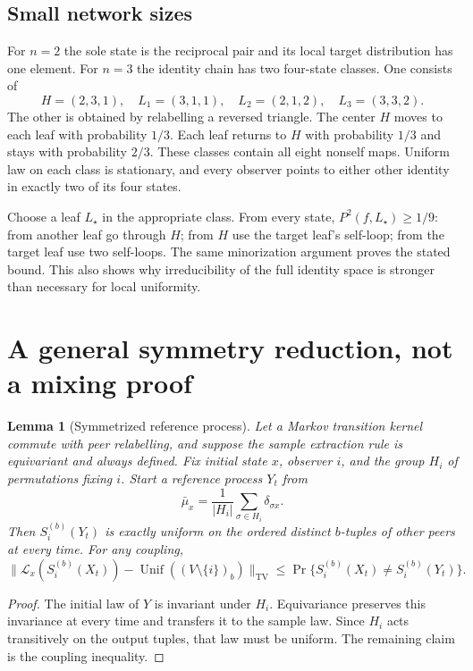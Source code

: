 \documentclass[11pt]{article}
\newtheorem{lemma}[theorem]{Lemma}
\newcommand{\TV}{\mathrm{TV}}
\newcommand{\Unif}{\operatorname{Unif}}
\newcommand{\Law}{\mathcal L}
\begin{document}
\subsection{Small network sizes}
For $n=2$ the sole state is the reciprocal pair and its local target
distribution has one element. For $n=3$ the identity chain has two
four-state classes. One consists of
\[
 H=(2,3,1),\quad L_1=(3,1,1),\quad
 L_2=(2,1,2),\quad L_3=(3,3,2).
\]
The other is obtained by relabelling a reversed triangle.
The center $H$ moves to each leaf with probability $1/3$.
Each leaf returns to $H$ with probability $1/3$ and stays with
probability $2/3$. These classes contain all eight nonself maps.
Uniform law on each class is stationary, and every observer points
to either other identity in exactly two of its four states.

Choose a leaf $L_\star$ in the appropriate class. From every state,
$P^2(f,L_\star)\ge1/9$: from another leaf go through $H$;
from $H$ use the target leaf's self-loop; from the target leaf use
two self-loops. The same minorization argument proves the stated
bound. This also shows why irreducibility of the full identity
space is stronger than necessary for local uniformity.

\section{A general symmetry reduction, not a mixing proof}

\begin{lemma}[Symmetrized reference process]
\label{lem:symmetry}
Let a Markov transition kernel commute with peer relabelling, and
suppose the sample extraction rule is equivariant and always defined.
Fix initial state $x$, observer $i$, and the group $H_i$ of
permutations fixing $i$. Start a reference process $Y_t$ from
\[
 \bar\mu_x=\frac1{|H_i|}\sum_{\sigma\in H_i}\delta_{\sigma x}.
\]
Then $S_i^{(b)}(Y_t)$ is exactly uniform on the ordered distinct
$b$-tuples of other peers at every time. For any coupling,
\[
 \|\Law_x(S_i^{(b)}(X_t))-\Unif((V\setminus\{i\})_b)\|_{\TV}
 \le\Pr\{S_i^{(b)}(X_t)\ne S_i^{(b)}(Y_t)\}.
\]
\end{lemma}
\begin{proof}
The initial law of $Y$ is invariant under $H_i$. Equivariance
preserves this invariance at every time and transfers it to the
sample law. Since $H_i$ acts transitively on the output tuples,
that law must be uniform. The remaining claim is the coupling
inequality.
\end{proof}
\end{document}
